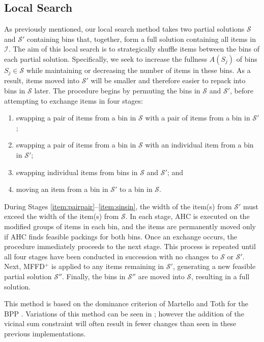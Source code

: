 \documentclass{IEEEtran}
\begin{document}
\subsection{Local Search}
\label{sub:localsearch}
As previously mentioned, our local search method takes two partial solutions $\mathcal{S}$ and $\mathcal{S}'$ containing bins that, together, form a full solution containing all items in $\mathcal{I}$. The aim of this local search is to strategically shuffle items between the bins of each partial solution. Specifically, we seek to increase the fullness $A(S_j)$ of bins $S_j \in \mathcal{S}$ while maintaining or decreasing the number of items in these bins. As a result, items moved into $\mathcal{S}'$ will be smaller and therefore easier to repack into bins in $\mathcal{S}$ later. The procedure begins by permuting the bins in $\mathcal{S}$ and $\mathcal{S}'$, before attempting to exchange items in four stages:
\begin{enumerate}[label={(\arabic*)}]
	\item swapping a pair of items from a bin in $\mathcal{S}$ with a pair of items from a bin in $\mathcal{S}'$;\label{item:pairpair}
	\item swapping a pair of items from a bin in $\mathcal{S}$ with an individual item from a bin in $\mathcal{S}'$;\label{item:pairsin}
	\item swapping individual items from bins in $\mathcal{S}$ and $\mathcal{S}'$;\label{item:sinsin} and
	\item moving an item from a bin in $\mathcal{S}'$ to a bin in $\mathcal{S}$.\label{item:movesin}
\end{enumerate} 
During Stages \ref{item:pairpair}--\ref{item:sinsin}, the width of the item(s) from $\mathcal{S}'$ must exceed the width of the item(s) from $\mathcal{S}$. In each stage, AHC is executed on the modified groups of items in each bin, and the items are permanently moved only if AHC finds feasible packings for both bins. Once an exchange occurs, the procedure immediately proceeds to the next stage. This process is repeated until all four stages have been conducted in succession with no changes to $\mathcal{S}$ or $\mathcal{S}'$. Next, MFFD$^+$ is applied to any items remaining in $\mathcal{S}'$, generating a new feasible partial solution $\mathcal{S}''$. Finally, the bins in $\mathcal{S}''$ are moved into $\mathcal{S}$, resulting in a full solution.

This method is based on the dominance criterion of Martello and Toth for the BPP \cite{martello1990l}. Variations of this method can be seen in \cite{lewis2009, lewis2017, falkenauer1996, levine2004}; however the addition of the vicinal sum constraint will often result in fewer changes than seen in these previous implementations.
\end{document}

